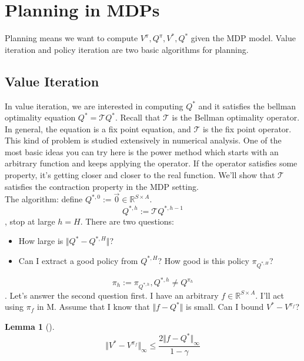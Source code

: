 \documentclass{report}
\newtheorem{lemma}[theorem]{Lemma}
\begin{document}
\section{Planning in MDPs}
Planning means we want to compute $V^{\pi}, Q^{\pi}, V^{*}, Q^{*}$ given the MDP model. Value iteration and policy iteration are two basic algorithms for planning.
\subsection{Value Iteration}
In value iteration, we are interested in computing $Q^*$ and it satisfies the bellman optimality equation $Q^*=\mathcal{T}Q^*$. Recall that $\mathcal{T}$ is the Bellman optimality operator. In general, the equation is a fix point equation, and $\mathcal{T}$ is the fix point operator. This kind of problem is studied extensively in numerical analysis. One of the most  basic ideas you can try here is the power method which starts with an arbitrary function and keeps applying the operator. If the operator satisfies some property, it's getting closer and closer to the real function. We'll show that $\mathcal{T}$ satisfies the contraction property in the MDP setting.\\
The algorithm: define $Q^{*,0}:=\Vec{0}\in \mathbb{R}^{S\times A}$. \[Q^{*,h}:=\mathcal{T}Q^{*,h-1}\], stop at large $h=H$. There are two questions:
\begin{itemize}
    \item How large is $\Vert Q^*-Q^{*, H}\Vert$?
    \item Can I extract a good policy from $Q^{*, H}$? How good is this policy $\pi_{Q^{*, H}}$?
\end{itemize}
\[\pi_h := \pi_{Q^{*,h}}, Q^{*,h} \neq Q^{\pi_h}\].
Let's answer the second question first. I have an arbitrary $f\in \mathbb{R}^{S\times A}$. I'll act using $\pi_f$ in M. Assume that I know that $\Vert f-Q^*\Vert$ is small. Can I bound $V^{*}-V^{\pi_f}$?
\begin{lemma}[\cite{Singh1994AnFunctions}]
    \[\Vert  V^*-V^{ \pi_f} \Vert_{\infty} \leq \frac{2 \Vert f-Q^{*}\Vert_{\infty}}{1-\gamma}\]
\end{lemma}
\end{document}
